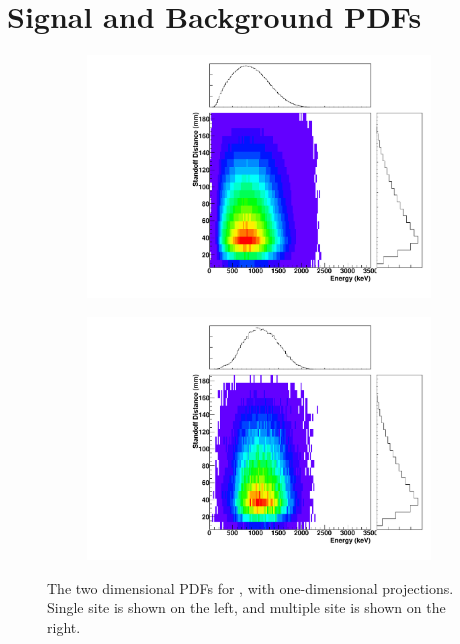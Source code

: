 \documentclass[herrin-thesis.tex]{subfiles}
\begin{document}
\chapter{Signal and Background PDFs}
\label{app:PDFs}

\begin{figure}[hp]
\centering
	\begin{subfigure}[b]{0.35\textwidth}
	\centering
	\includegraphics[width=\textwidth]{./plots/PDFs/analysis_pdf_bb2n_ss.pdf}
\end{subfigure}\hspace{0.1\textwidth}%
\begin{subfigure}[b]{0.35\textwidth}
	\centering
	\includegraphics[width=1\textwidth]{./plots/PDFs/analysis_pdf_bb2n_ms.pdf}
	\end{subfigure}
\caption[PDF for \twonu{}]{The two dimensional PDFs for \twonu{}, with one-dimensional projections. Single site is shown on the left, and multiple site is shown on the right.}
\label{fig:analysis_pdf_bb2n}
\end{figure}
\end{document}
